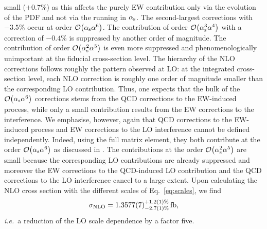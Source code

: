 \documentclass[a4article,11pt]{article}
\begin{document}
small ($+0.7\%$) as this affects the purely EW contribution only via
the evolution of the PDF and not via the running in $\alpha_\text{s}$.
The second-largest corrections with $-3.5\%$ occur at order
$\mathcal{O}{\left(\alpha_\text{s}\alpha^{6}\right)}$.  The
contribution of order  $\mathcal{O}{\left(\alpha_\text{s}^{3}\alpha^{4}\right)}$ with a correction of $-0.4\%$ is suppressed by another order of magnitude.
The contribution of order $\mathcal{O}{\left(\alpha_\text{s}^{2}\alpha^{5}\right)}$ is even more suppressed and phenomenologically unimportant at the fiducial cross-section level.
The hierarchy of the NLO corrections follows roughly the pattern
observed at LO: at the integrated cross-section level, each NLO
correction is roughly one order of
magnitude smaller than the corresponding LO contribution.  Thus, one expects that the
bulk of the $\mathcal{O}{\left(\alpha_\text{s}\alpha^{6}\right)}$
corrections stems from the QCD corrections to the EW-induced process,
while only a small contribution results from the EW corrections to
the interference.
We emphasise, however, again that QCD corrections to the EW-induced process
and EW corrections to the LO interference cannot be defined
independently.  Indeed, using the full matrix element, they both
contribute at the order $\mathcal{O}{\left(\alpha_{\rm
      s}\alpha^{6}\right)}$ as discussed in .
The contributions at the order $\mathcal{O}{\left(\alpha_{\rm
      s}^{2}\alpha^{5}\right)}$ are small because the corresponding LO
contributions are already suppressed and moreover the EW corrections
to the QCD-induced LO contribution and the QCD corrections to the LO
interference cancel to a large extent.
Upon calculating the NLO cross section with the different scales of
Eq.~\eqref{eq:scales}, we find
\begin{equation} 
\sigma_{\rm NLO} =  1.3577(7)_{-2.7(1)\%}^{+1.2(1)\%}\fb, 
\end{equation}
\emph{i.e.}\ a reduction of the LO scale dependence by a factor {five}.
\end{document}
